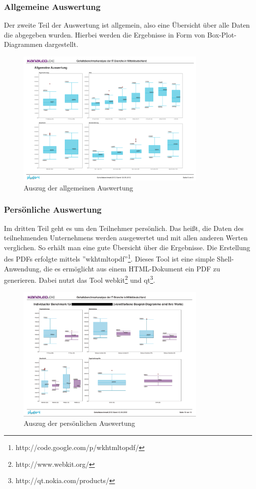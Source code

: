 \subsubsection{Allgemeine Auswertung}
Der zweite Teil der Auswertung ist allgemein, also eine Übersicht über alle Daten die abgegeben wurden. Hierbei werden die Ergebnisse in Form von Box-Plot-Diagrammen dargestellt.
\newpage
\begin{figure}[htbp]
 \centering
 \includegraphics[width=350px]{./material/allgemeine_auswertung.png}
 \caption{Auszug der allgemeinen Auswertung}
 \label{fig:allg_auswertung}
\end{figure}
\subsubsection{Persönliche Auswertung}
Im dritten Teil geht es um den Teilnehmer persönlich. Das
heißt, die Daten des teilnehmenden Unternehmens werden ausgewertet und mit allen
anderen Werten verglichen. So erhält man eine gute Übersicht über die
Ergebnisse. Die Erstellung des PDFs erfolgte mittels
''wkhtmltopdf''\footnote{http://code.google.com/p/wkhtmltopdf/}. Dieses Tool
ist eine simple Shell-Anwendung, die es ermöglicht aus einem HTML-Dokument ein
PDF zu generieren. Dabei nutzt das Tool webkit\footnote{http://www.webkit.org/}
und qt\footnote{http://qt.nokia.com/products/}. 
\begin{figure}[htbp]
 \centering
 \includegraphics[width=350px]{./material/pers_auswertung.png}
 \caption{Auszug der persönlichen Auswertung}
 \label{fig:pers_auswertung}
\end{figure}
